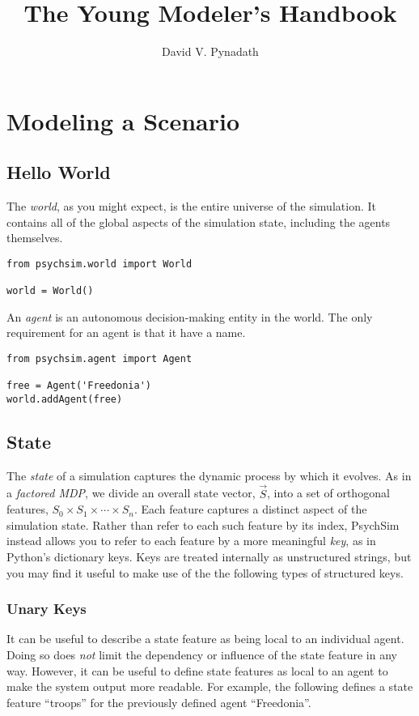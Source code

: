 \documentclass{book}
\title{The Young Modeler's Handbook}
\author{David V. Pynadath}
\begin{document}
\maketitle
\chapter{Modeling a Scenario}

\section{Hello World}
The {\em world}, as you might expect, is the entire universe of the simulation. It contains all of the global aspects of the simulation state, including the agents themselves.

\begin{verbatim}
from psychsim.world import World

world = World()
\end{verbatim}

An {\em agent} is an autonomous decision-making entity in the world. The only requirement for an agent is that it have a name.

\begin{verbatim}
from psychsim.agent import Agent

free = Agent('Freedonia')
world.addAgent(free)
\end{verbatim}

\section{State}
The {\em state} of a simulation captures the dynamic process by which it evolves. As in a {\em factored MDP}, we divide an overall state vector, $\vec S$, into a set of orthogonal features, $S_0\times S_1\times\cdots\times S_n$. Each feature captures a distinct aspect of the simulation state. Rather than refer to each such feature by its index, PsychSim instead allows you to refer to each feature by a more meaningful {\em key}, as in Python's dictionary keys. Keys are treated internally as unstructured strings, but you may find it useful to make use of the the following types of structured keys.

\subsection{Unary Keys}
It can be useful to describe a state feature as being local to an individual agent. Doing so does {\em not} limit the dependency or influence of the state feature in any way. However, it can be useful to define state features as local to an agent to make the system output more readable. For example, the following defines a state feature ``troops'' for the previously defined agent ``Freedonia''.
\end{document}
